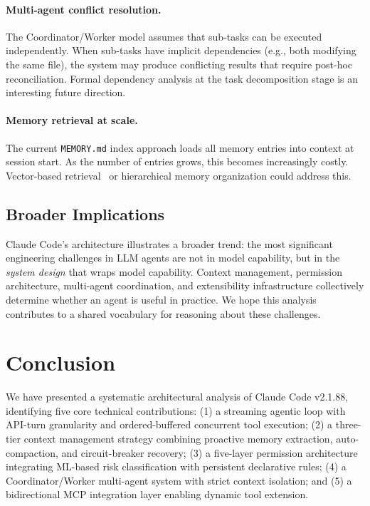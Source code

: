 \documentclass{article}
\begin{document}
\paragraph{Multi-agent conflict resolution.}
The Coordinator/Worker model assumes that sub-tasks can be executed independently. When sub-tasks have implicit dependencies (e.g., both modifying the same file), the system may produce conflicting results that require post-hoc reconciliation. Formal dependency analysis at the task decomposition stage is an interesting future direction.

\paragraph{Memory retrieval at scale.}
The current \texttt{MEMORY.md} index approach loads all memory entries into context at session start. As the number of entries grows, this becomes increasingly costly. Vector-based retrieval~\cite{lewis2020retrieval} or hierarchical memory organization could address this.

\subsection{Broader Implications}

Claude Code's architecture illustrates a broader trend: the most significant engineering challenges in LLM agents are not in model capability, but in the \emph{system design} that wraps model capability. Context management, permission architecture, multi-agent coordination, and extensibility infrastructure collectively determine whether an agent is useful in practice. We hope this analysis contributes to a shared vocabulary for reasoning about these challenges.

\section{Conclusion}

We have presented a systematic architectural analysis of Claude Code v2.1.88, identifying five core technical contributions: (1) a streaming agentic loop with API-turn granularity and ordered-buffered concurrent tool execution; (2) a three-tier context management strategy combining proactive memory extraction, auto-compaction, and circuit-breaker recovery; (3) a five-layer permission architecture integrating ML-based risk classification with persistent declarative rules; (4) a Coordinator/Worker multi-agent system with strict context isolation; and (5) a bidirectional MCP integration layer enabling dynamic tool extension.
\end{document}
